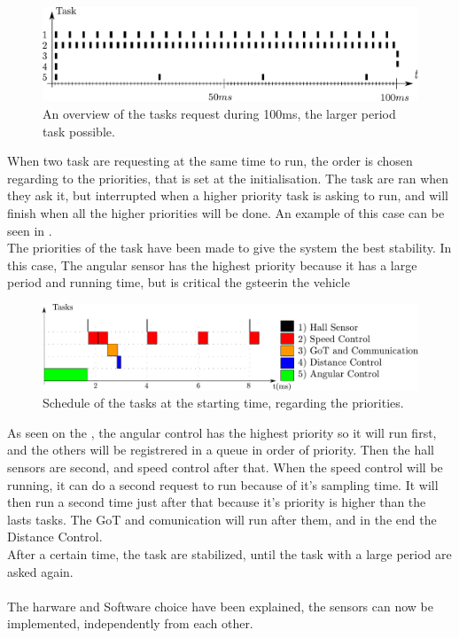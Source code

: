  \begin{figure}[H]
	\centering
	\includegraphics[scale=0.6]{figures/scheduleRequest.pdf}
	\caption{An overview of the tasks request during 100ms, the larger period task possible.}
	\label{scheduleRequestdRobinSchedule}
\end{figure}


When two task are requesting at the same time to run, the order is chosen regarding to the priorities, that is set at the initialisation. The task are ran when they ask it, but interrupted when a higher priority task is asking to run, and will finish when all the higher priorities will be done. An example of this case can be seen in .\\
The priorities of the task have been made to give the system the best stability. In this case, The angular sensor has the highest priority because it has a large period and running time, but is critical  the gsteerin the vehicle

 \begin{figure}[H]
	\centering
	\includegraphics[scale=0.5]{figures/schedulePriorities.pdf}
	\caption{Schedule of the tasks at the starting time, regarding the priorities.}
	\label{schedulePriorities}
\end{figure}

As seen on the  , the angular control has the highest priority so it will run first, and the others will be registrered in a queue in order of priority. Then the hall sensors are second, and speed control after that. When the speed control will be running, it can do a second request to run because of it's sampling time. It will then run a second time just after that because it's priority is higher than the lasts tasks. The GoT and comunication will run after them, and in the end the Distance Control.\\
After a certain time, the task are stabilized, until the task with a large period are asked again.\\\\



The harware and Software choice have been explained, the sensors can now be implemented, independently from each other.